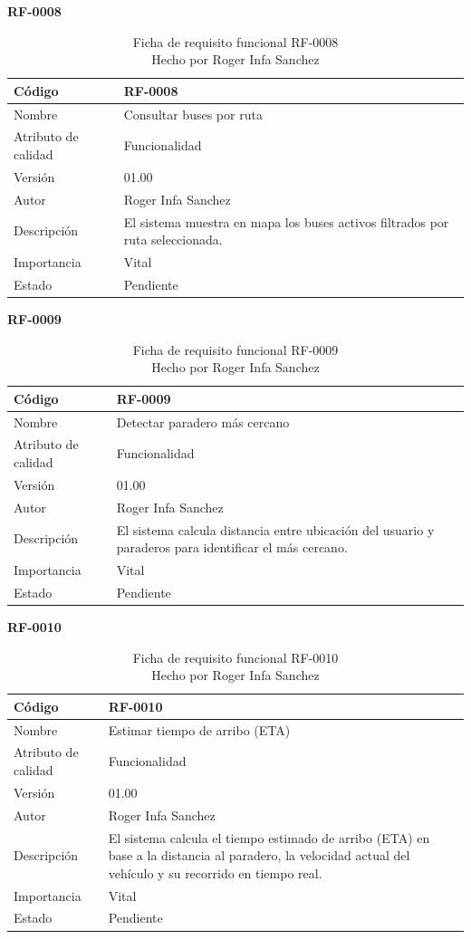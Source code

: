 \textbf{RF-0008}
\begin{longtable}{|p{}|p{}|}
\caption{Ficha de requisito funcional RF-0008\\Hecho por Roger Infa Sanchez} \\
\hline
Código & RF-0008 \\
\hline
Nombre & Consultar buses por ruta \\
\hline
Atributo de calidad & Funcionalidad \\
\hline
Versión & 01.00 \\
\hline
Autor & Roger Infa Sanchez \\
\hline
Descripción & El sistema muestra en mapa los buses activos filtrados por ruta seleccionada. \\
\hline
Importancia & Vital \\
\hline
Estado & Pendiente \\
\hline
\end{longtable}

\textbf{RF-0009}
\begin{longtable}{|p{}|p{}|}
\caption{Ficha de requisito funcional RF-0009\\Hecho por Roger Infa Sanchez} \\
\hline
Código & RF-0009 \\
\hline
Nombre & Detectar paradero más cercano \\
\hline
Atributo de calidad & Funcionalidad \\
\hline
Versión & 01.00 \\
\hline
Autor & Roger Infa Sanchez \\
\hline
Descripción & El sistema calcula distancia entre ubicación del usuario y paraderos para identificar el más cercano. \\
\hline
Importancia & Vital \\
\hline
Estado & Pendiente \\
\hline
\end{longtable}

\textbf{RF-0010}
\begin{longtable}{|p{}|p{}|}
\caption{Ficha de requisito funcional RF-0010\\Hecho por Roger Infa Sanchez} \\
\hline
Código & RF-0010 \\
\hline
Nombre & Estimar tiempo de arribo (ETA) \\
\hline
Atributo de calidad & Funcionalidad \\
\hline
Versión & 01.00 \\
\hline
Autor & Roger Infa Sanchez \\
\hline
Descripción & El sistema calcula el tiempo estimado de arribo (ETA) en base a la distancia al paradero, la velocidad actual del vehículo y su recorrido en tiempo real. \\
\hline
Importancia & Vital \\
\hline
Estado & Pendiente \\
\hline
\end{longtable}

